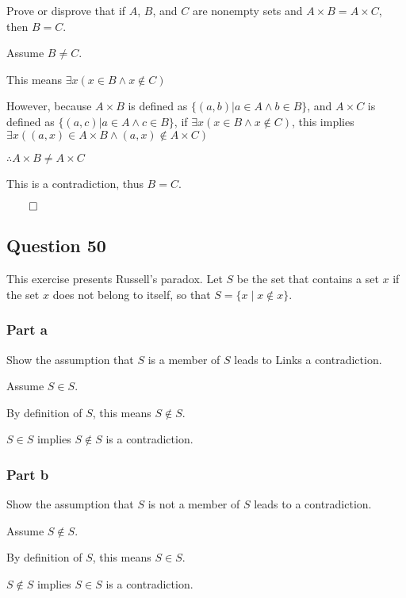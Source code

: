 \documentclass[12pt]{article}
\begin{document}
Prove or disprove that if $A$, $B$, and $C$ are nonempty sets and
$A \times B = A \times C$, then $B = C$.

Assume $B \neq C$. 

This means $\exists x (x \in B \land x \notin C)$

However, because $A \times B$ is defined as $\{(a, b) | a \in A \land b \in B\}$,
and $A \times C$ is defined as $\{(a, c) | a \in A \land c \in B\}$,
if $\exists x (x \in B \land x \notin C)$, this implies 
$\exists x ((a, x) \in A \times B \land (a, x) \notin A \times C)$

$\therefore A \times B \neq A \times C$

This is a contradiction, thus $B = C$.

$\qed$

\subsection*{Question 50}


This exercise presents Russell's paradox. Let $S$ be the set that contains a
set $x$ if the set $x$ does not belong to itself, so that 
$S = \{ x \mid x \notin x \}$.

\subsubsection*{Part a}

Show the assumption that $S$ is a member of $S$ leads to Links a contradiction.

Assume $S \in S$.

By definition of $S$, this means $S \notin S$.

$S \in S$ implies $S \notin S$ is a contradiction.

\subsubsection*{Part b}

Show the assumption that $S$ is not a member of $S$ leads to a contradiction.

Assume $S \notin S$.

By definition of $S$, this means $S \in S$.

$S \notin S$ implies $S \in S$ is a contradiction.
\end{document}
